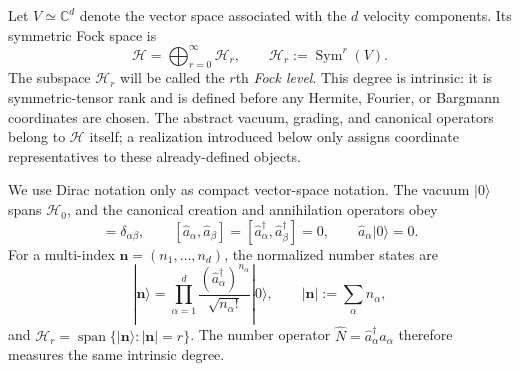 \documentclass[11pt,oneside]{article}
\numberwithin{equation}{section}
\theoremstyle{definition}
\begin{document}
Let $V\simeq\mathbb C^d$ denote the vector space associated with the $d$ velocity components.  Its symmetric Fock space is
\begin{equation}
\mathscr H
=
\bigoplus_{r=0}^{\infty}\mathscr H_r,
\qquad
\mathscr H_r:=\operatorname{Sym}^r(V).
\label{eq:maxwell_symmetric_fock_def}
\end{equation}
The subspace $\mathscr H_r$ will be called the $r$th \emph{Fock level}.  This degree is intrinsic: it is symmetric-tensor rank and is defined before any Hermite, Fourier, or Bargmann coordinates are chosen.  The abstract vacuum, grading, and canonical operators belong to $\mathscr H$ itself; a realization introduced below only assigns coordinate representatives to these already-defined objects.

We use Dirac notation only as compact vector-space notation.  The vacuum $|0\rangle$ spans $\mathscr H_0$, and the canonical creation and annihilation operators obey
\begin{equation}
[\hat a_\alpha,\hat a_\beta^\dagger]=\delta_{\alpha\beta},
\qquad
[\hat a_\alpha,\hat a_\beta]=
[\hat a_\alpha^\dagger,\hat a_\beta^\dagger]=0,
\qquad
\hat a_\alpha|0\rangle=0.
\label{eq:maxwell_CCR_intro}
\end{equation}
For a multi-index $\bm n=(n_1,\ldots,n_d)$, the normalized number states are
\begin{equation}
|\bm n\rangle
=
\prod_{\alpha=1}^{d}
\frac{(\hat a_\alpha^\dagger)^{n_\alpha}}{\sqrt{n_\alpha!}}
|0\rangle,
\qquad
|\bm n|:=\sum_\alpha n_\alpha,
\label{eq:maxwell_number_states_intro}
\end{equation}
and $\mathscr H_r=\operatorname{span}\{|\bm n\rangle:|\bm n|=r\}$.  The number operator $\hat N=\hat a_\alpha^\dagger\hat a_\alpha$ therefore measures the same intrinsic degree.
\end{document}
